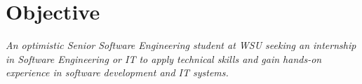 \section{ Objective}
\textit{An optimistic Senior Software Engineering student at WSU seeking an internship in Software Engineering or IT to apply technical skills and gain hands-on experience in software development and IT systems.}\\